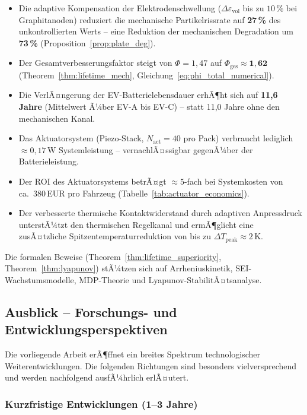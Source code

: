 ﻿\documentclass[12pt,a4paper]{article}
\begin{document}
	\begin{itemize}[leftmargin=*]
		\item Die adaptive Kompensation der Elektrodenschwellung ($\Delta \varepsilon_\mathrm{vol}$
		bis zu $10\,\%$ bei Graphitanoden) reduziert die mechanische
		Partikelrissrate auf \textbf{27\,\%} des unkontrollierten Werts
		-- eine Reduktion der mechanischen Degradation um \textbf{73\,\%}
		(Proposition~\ref{prop:plate_deg}).
		\item Der Gesamtverbesserungsfaktor steigt von $\Phi = 1{,}47$ auf
		$\Phi_\mathrm{ges} \approx \mathbf{1{,}62}$ (Theorem~\ref{thm:lifetime_mech},
		Gleichung~\eqref{eq:phi_total_numerical}).
		\item Die VerlÃ¤ngerung der EV-Batterielebensdauer erhÃ¶ht sich auf
		\textbf{11{,}6 Jahre} (Mittelwert Ã¼ber EV-A bis EV-C) -- statt
		11{,}0 Jahre ohne den mechanischen Kanal.
		\item Das Aktuatorsystem (Piezo-Stack, $N_\mathrm{act} = 40$ pro Pack)
		verbraucht lediglich $\approx 0{,}17\,\mathrm{W}$ Systemleistung --
		vernachlÃ¤ssigbar gegenÃ¼ber der Batterieleistung.
		\item Der ROI des Aktuatorsystems betrÃ¤gt $\approx 5$-fach bei
		Systemkosten von ca.\ 380\,EUR pro Fahrzeug
		(Tabelle~\ref{tab:actuator_economics}).
		\item Der verbesserte thermische Kontaktwiderstand durch adaptiven
		Anpressdruck unterstÃ¼tzt den thermischen Regelkanal und ermÃ¶glicht
		eine zusÃ¤tzliche Spitzentemperaturreduktion von bis zu
		$\Delta T_\mathrm{peak} \approx 2\,\mathrm{K}$.
	\end{itemize}
	
	Die formalen Beweise (Theorem~\ref{thm:lifetime_superiority},
	Theorem~\ref{thm:lyapunov}) stÃ¼tzen sich auf Arrheniuskinetik,
	SEI-Wachstumsmodelle, MDP-Theorie und Lyapunov-StabilitÃ¤tsanalyse.
	
	\subsection{Ausblick -- Forschungs- und Entwicklungsperspektiven}
	
	Die vorliegende Arbeit erÃ¶ffnet ein breites Spektrum technologischer
	Weiterentwicklungen. Die folgenden Richtungen sind besonders vielversprechend
	und werden nachfolgend ausfÃ¼hrlich erlÃ¤utert.
	
	\subsubsection{Kurzfristige Entwicklungen (1--3 Jahre)}
	
\end{document}
